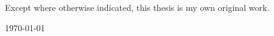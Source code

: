\vspace*{14cm}
\begin{center}
  \makeatletter
  {\selectfont\textcopyright}\ \@author{} \number\year
  \makeatother
\end{center}
\noindent
\begin{center}
  \footnotesize{~} %
\end{center}
\noindent

\newpage

\vspace*{7cm}
\begin{center}
  Except where otherwise indicated, this thesis is my own original
  work.
\end{center}

\vspace*{4cm}

\hspace{8cm}\makeatletter\@author\makeatother\par
\hspace{8cm}\today
